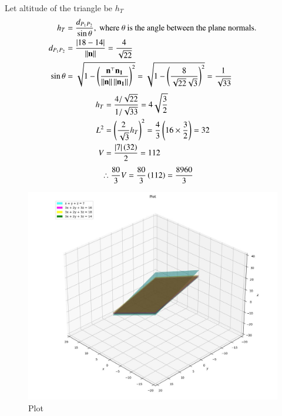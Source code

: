 \documentclass[xournal]{IEEEtran}
\begin{document}
Let altitude of the triangle be $h_T$
\begin{align}
    h_T &= \frac{d_{P_1P_2}}{\sin\theta},\text{ where }\theta\text{ is the angle between the plane normals.} \\
    d_{P_1P_2} &= \frac{\left\vert18-14\right\vert}{\left\lVert\mathbf{n}\right\rVert} = \frac{4}{\sqrt{22}} \\
    \sin\theta &= \sqrt{1 - \left(\frac{\mathbf{n}^\top\mathbf{n_1}}{\left\lVert\mathbf{n}\right\rVert\left\lVert\mathbf{n_1}\right\rVert}\right)^2} = \sqrt{1 - \left(\frac{8}{\sqrt{22}\sqrt{3}}\right)^2} = \frac{1}{\sqrt{33}}
\end{align}
\begin{align}
    h_T &= \frac{4/\sqrt{22}}{1/\sqrt{33}} = 4\sqrt{\frac{3}{2}} \\
    L^2 &= \left(\frac{2}{\sqrt{3}}h_T\right)^2 = \frac{4}{3}\left(16 \times \frac{3}{2}\right) = 32 \\
    V &= \frac{\left\vert7\right\vert\left(32\right)}{2} = 112
\end{align}
\begin{align}
    \therefore \frac{80}{3}V &= \frac{80}{3}\left(112\right) = \frac{8960}{3}
\end{align}

\begin{figure}[h!]
	\centering
	\includegraphics[width=\columnwidth]{figs/plot_p.jpg}
	\caption*{Plot}
	\label{fig:fig}
\end{figure}
\end{document}
